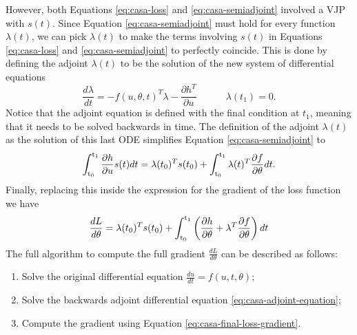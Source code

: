 However, both Equations \eqref{eq:casa-loss} and \eqref{eq:casa-semiadjoint} involved a VJP with $s(t)$. 
Since Equation \eqref{eq:casa-semiadjoint} must hold for every function $\lambda(t)$, we can pick $\lambda(t)$ to make the terms involving $s(t)$ in Equations \eqref{eq:casa-loss} and \eqref{eq:casa-semiadjoint} to perfectly coincide. 
This is done by defining the adjoint $\lambda(t)$ to be the solution of the new system of differential equations
\begin{equation}
    \frac{d\lambda}{dt} 
    = 
    - 
    f(u, \theta, t)^T \lambda  
    - 
    \frac{\partial h^T}{\partial u} 
    \qquad \quad \lambda(t_1) = 0. 
    \label{eq:casa-adjoint-equation}
\end{equation}
Notice that the adjoint equation is defined with the final condition at $t_1$, meaning that it needs to be solved backwards in time. 
The definition of the adjoint $\lambda(t)$ as the solution of this last ODE simplifies Equation \eqref{eq:casa-semiadjoint} to
\begin{equation}
    \operatorname{\int_{t_0}^{t_1}} \frac{\partial h}{\partial u} s(t) dt
    = 
    \lambda(t_0)^T s(t_0)
    + 
    \operatorname{\int_{t_0}^{t_1}} \lambda(t)^T \frac{\partial f}{\partial \theta} dt.
\end{equation}
Finally, replacing this inside the expression for the gradient of the loss function we have 
\begin{equation}
    \frac{dL}{d\theta}
    = 
    \lambda(t_0)^T s(t_0)
    + 
    \operatorname{\int_{t_0}^{t_1}}
    \left( \frac{\partial h}{\partial \theta} + \lambda^T \frac{\partial f}{\partial \theta} \right) dt
    \label{eq:casa-final-loss-gradient}
\end{equation}
The full algorithm to compute the full gradient $\frac{dL}{d\theta}$ can be described as follows:
\begin{enumerate}
    \item Solve the original differential equation $\frac{du}{dt} = f(u, t, \theta)$;
    \item Solve the backwards adjoint differential equation \eqref{eq:casa-adjoint-equation};
    \item Compute the gradient using Equation \eqref{eq:casa-final-loss-gradient}.
\end{enumerate}
